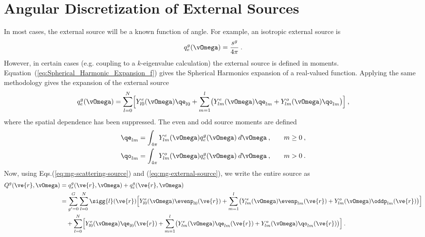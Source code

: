 \documentclass{article}
\numberwithin{equation}{subsection}
\begin{document}
\section{Angular Discretization of External Sources}
\label{sec:angul-discr-extern}

In most cases, the external source will be a known function of angle.  For
example, an isotropic external source is
\begin{equation}
  q^g_e(\vOmega) = \frac{s^g}{4\pi}\:.
\end{equation}
However, in certain cases (e.g. coupling to a $k$-eigenvalue calculation) the
external source is defined in moments.
Equation~(\ref{eq:Spherical_Harmonic_Expansion_f}) gives the Spherical
Harmonics expansion of a real-valued function.  Applying the same methodology
gives the expansion of the external source
\begin{equation}
  q^g_e(\vOmega) = \sum_{l=0}^{N}\Bigl[
  Y^e_{l0}(\vOmega)\qe_{l0} +
  \sum_{m=1}^{l}
  \bigr(
  Y^e_{lm}(\vOmega)\qe_{lm} + Y^o_{lm}(\vOmega)\qo_{lm}\bigr)
  \Bigr]\:,
  \label{eq:mg-external-source}
\end{equation}
where the spatial dependence has been suppressed.  The even and odd source
moments are defined
\begin{alignat}{3}
  \qe_{lm} &= \int_{4\pi}Y^e_{lm}(\vOmega)q^g_e(\vOmega)\:d\vOmega\:,
  \quad&m\ge 0\:,\label{eq:even-source}\\
  \qo_{lm} &= \int_{4\pi}Y^o_{lm}(\vOmega)q^g_e(\vOmega)\:d\vOmega\:,
  \quad&m>0\:.\label{eq:odd-source}
\end{alignat}
Now, using Eqs.(\ref{eq:mg-scattering-source}) and
(\ref{eq:mg-external-source}), we write the entire source as
\begin{equation}
  \begin{split}
    Q^g(\ve{r},\vOmega) &= q^g_s(\ve{r},\vOmega) +
    q^g_e(\ve{r},\vOmega)\\
    &=\sum_{g'=0}^G
    \sum_{l=0}^N
    \sigg{l}(\ve{r})
    \Bigl[
    Y^e_{l0}(\vOmega)\evenp_{l0}(\ve{r}) +
    \sum_{m=1}^l
    \bigl(
    Y^e_{lm}(\vOmega)\evenp_{lm}(\ve{r}) +
    Y^o_{lm}(\vOmega)\oddp_{lm}(\ve{r})
    \bigr)\Bigr]\\
    &\quad+
    \sum_{l=0}^{N}\Bigl[
    Y^e_{l0}(\vOmega)\qe_{l0}(\ve{r}) +
    \sum_{m=1}^{l}
    \bigl(
    Y^e_{lm}(\vOmega)\qe_{lm}(\ve{r}) +
    Y^o_{lm}(\vOmega)\qo_{lm}(\ve{r})\bigr)
    \Bigr]\:.
  \end{split}
  \label{eq:mg-source}
\end{equation}
\end{document}
